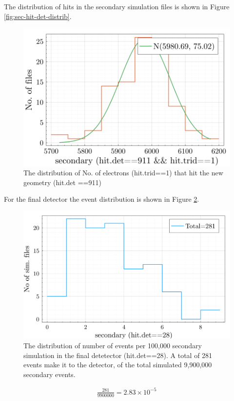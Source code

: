 \documentclass[a4paper,12pt]{article}
\begin{document}
    The distribution of hits in the secondary simulation files is shown in Figure \ref{fig:sec-hit-det-distrib}. 

    \begin{figure}[h!]
        \centering
        \includegraphics[width=1\linewidth]{image/helicoil-20221121-113016-img-secondary-trid-hit-count-hist.png}
        \caption{The distribution of No. of electrons (hit.trid==1) that hit the new geometry (hit.det ==911)}
        \label{fig:sec-hit-911-trid-1}
    \end{figure}

    For the final detector the event distribution is shown in Figure \ref{fig:sec-hit-28-no-trid}.
    \begin{figure}[h!]
        \centering
        \includegraphics[width=0.9\linewidth]{image/helicoil-20221121-113016-secondary-fin-det-hit.png}
        \caption{The distribution of number of events per 100,000 secondary simulation in the final detetector (hit.det==28). A total of 281 events make it to the detector, of the total simulated 9,900,000 secondary events.}
        \label{fig:sec-hit-28-no-trid}
    \end{figure}
    \begin{align*}
        \frac{281}{9900000} = 2.83 \times 10^{-5}
    \end{align*}
\end{document}
